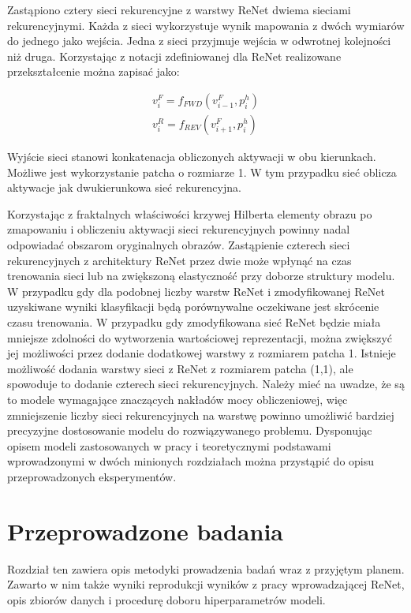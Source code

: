 \documentclass[oneside, mag]{mgr}
\begin{document}
Zastąpiono cztery sieci rekurencyjne z warstwy ReNet dwiema sieciami rekurencyjnymi. Każda z sieci wykorzystuje wynik mapowania z dwóch wymiarów do jednego jako wejścia. Jedna z sieci przyjmuje wejścia w odwrotnej kolejności niż druga. Korzystając z notacji zdefiniowanej dla ReNet realizowane przekształcenie można zapisać jako:

\begin{gather}
	v_{i}^{F} = f_{FWD}(v_{i-1}^{F}, p_{i}^{h}) \\ \nonumber
	v_{i}^{R} = f_{REV}(v_{i+1}^{F}, p_{i}^{h})
\end{gather}

Wyjście sieci stanowi konkatenacja obliczonych aktywacji w obu kierunkach. Możliwe jest wykorzystanie patcha o rozmiarze 1. W tym przypadku sieć oblicza aktywacje jak dwukierunkowa sieć rekurencyjna.

Korzystając z fraktalnych właściwości krzywej Hilberta elementy obrazu po zmapowaniu i obliczeniu aktywacji sieci rekurencyjnych powinny nadal odpowiadać obszarom oryginalnych obrazów. Zastąpienie czterech sieci rekurencyjnych z architektury ReNet przez dwie może wpłynąć na czas trenowania sieci lub na zwiększoną elastyczność przy doborze struktury modelu. W przypadku gdy dla podobnej liczby warstw ReNet i zmodyfikowanej ReNet uzyskiwane wyniki klasyfikacji będą porównywalne oczekiwane jest skrócenie czasu trenowania. W przypadku gdy zmodyfikowana sieć ReNet będzie miała mniejsze zdolności do wytworzenia wartościowej reprezentacji, można zwiększyć jej możliwości przez dodanie dodatkowej warstwy z rozmiarem patcha 1. Istnieje możliwość dodania warstwy sieci z ReNet z rozmiarem patcha (1,1), ale spowoduje to dodanie czterech sieci rekurencyjnych. Należy mieć na uwadze, że są to modele wymagające znaczących nakładów mocy obliczeniowej, więc zmniejszenie liczby sieci rekurencyjnych na warstwę powinno umożliwić bardziej precyzyjne dostosowanie modelu do rozwiązywanego problemu. Dysponując opisem modeli zastosowanych w pracy i teoretycznymi podstawami wprowadzonymi w dwóch minionych rozdziałach można przystąpić do opisu przeprowadzonych eksperymentów.


\chapter{Przeprowadzone badania}

Rozdział ten zawiera opis metodyki prowadzenia badań wraz z przyjętym planem. Zawarto w nim także wyniki reprodukcji wyników z  pracy wprowadzającej ReNet, opis zbiorów danych i procedurę doboru hiperparametrów modeli.
\end{document}
